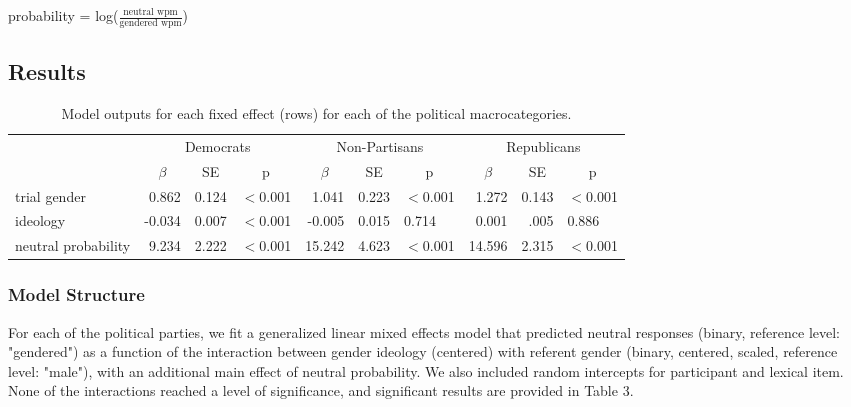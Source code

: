 \documentclass[10pt,letterpaper]{article}
\begin{document}
	\begin{exe}
		\item	probability = log($\frac{\textrm{neutral wpm}}{\textrm{gendered wpm}}$)
	\end{exe}
	
	
	\subsection{Results}
	
		
	\begin{table}[h!]
		\centering
		\caption{Model outputs for each fixed effect (rows) for each of the political macrocategories.}
		\vskip 0.12in
		\begin{tabular}{l r r l r r l r r l }
					\toprule
					& \multicolumn{3}{c}{Democrats} & \multicolumn{3}{c}{Non-Partisans} & \multicolumn{3}{c}{Republicans} \\ \cmidrule(r){2-4} \cmidrule(r){5-7} \cmidrule(r){8-10}
					& \multicolumn{1}{c}{$\beta$} & \multicolumn{1}{c}{SE} & \multicolumn{1}{c}{p} & \multicolumn{1}{c}{$\beta$} & \multicolumn{1}{c}{SE} & \multicolumn{1}{c}{p} & \multicolumn{1}{c}{$\beta$} & \multicolumn{1}{c}{SE} & \multicolumn{1}{c}{p}\\ 
					\midrule
					trial gender   & 0.862 & 0.124 & \cellcolor{lightgray} $<$0.001        & 1.041 & 0.223 & \cellcolor{lightgray} $<$0.001 & 1.272  & 0.143 &  \cellcolor{lightgray} $<$0.001\\
					ideology & -0.034  & 0.007 & \cellcolor{lightgray} $<$0.001            & -0.005 & 0.015& 0.714           & 0.001  & .005 & 0.886 \\
					neutral probability & 9.234 & 2.222  &  \cellcolor{lightgray} $<$0.001            & 15.242 & 4.623 & \cellcolor{lightgray} $<$0.001     & 14.596  & 2.315 & \cellcolor{lightgray} $<$0.001\\
					\bottomrule
				\end{tabular}
				\label{tab:exp2results}
			\end{table}
	
	\subsubsection{Model Structure} For each of the political parties, we fit a generalized linear mixed effects model that predicted neutral responses (binary, reference level: "gendered") as a function of the interaction between gender ideology (centered) with referent gender (binary, centered, scaled, reference level: "male"), with an additional main effect of neutral probability. We also included random intercepts for participant and lexical item. None of the interactions reached a level of significance, and significant results are provided in Table 3.
	
\end{document}
